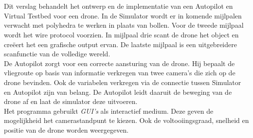 \\\\
Dit verslag behandelt het ontwerp en de implementatie van een Autopilot en Virtual Testbed voor een drone. In de Simulator wordt er in komende mijlpalen verwacht met polyhedra te werken in plaats van bollen. Voor de tweede mijlpaal wordt het wire protocol voorzien. In mijlpaal drie scant de drone het object en cre\"eert het een grafische output ervan. De laatste mijlpaal is een uitgebreidere scanfunctie van de volledige wereld. 
\\
De Autopilot zorgt voor een correcte aansturing van de drone. Hij bepaalt de vliegroute op basis van informatie verkregen van twee camera's die zich op de drone bevinden. Ook de variabelen verkregen via de connectie tussen Simulator en Autopilot zijn van belang. De Autopilot leidt daaruit de beweging van de drone af en laat de simulator deze uitvoeren.
\\
Het programma gebruikt \textit{GUI's} als interactief medium. Deze geven de mogelijkheid het camerastandpunt te kiezen. Ook de voltooiingsgraad, snelheid en positie van de drone worden weergegeven.